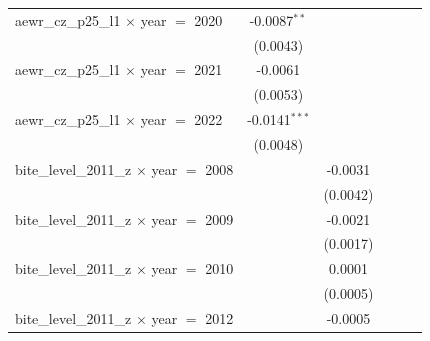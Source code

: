 \begin{tabular}{lccccc}
   aewr\_cz\_p25\_l1 $\times$ year $=$ 2020                     & -0.0087$^{**}$     &                 &                       &                            &   \\   
                                                                & (0.0043)           &                 &                       &                            &   \\   
   aewr\_cz\_p25\_l1 $\times$ year $=$ 2021                     & -0.0061            &                 &                       &                            &   \\   
                                                                & (0.0053)           &                 &                       &                            &   \\   
   aewr\_cz\_p25\_l1 $\times$ year $=$ 2022                     & -0.0141$^{***}$    &                 &                       &                            &   \\   
                                                                & (0.0048)           &                 &                       &                            &   \\   
   bite\_level\_2011\_z $\times$ year $=$ 2008                  &                    & -0.0031         &                       &                            &   \\   
                                                                &                    & (0.0042)        &                       &                            &   \\   
   bite\_level\_2011\_z $\times$ year $=$ 2009                  &                    & -0.0021         &                       &                            &   \\   
                                                                &                    & (0.0017)        &                       &                            &   \\   
   bite\_level\_2011\_z $\times$ year $=$ 2010                  &                    & 0.0001          &                       &                            &   \\   
                                                                &                    & (0.0005)        &                       &                            &   \\   
   bite\_level\_2011\_z $\times$ year $=$ 2012                  &                    & -0.0005         &                       &                            &   \\   

\end{tabular}
